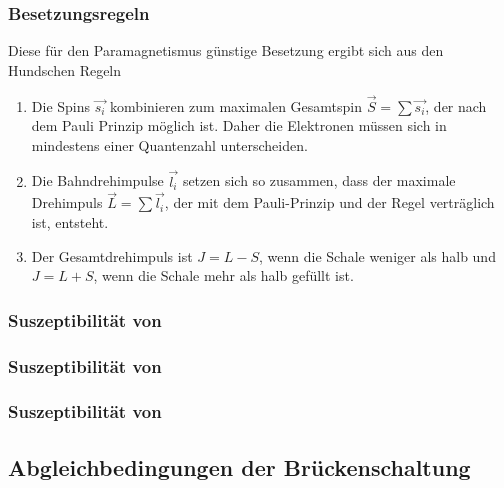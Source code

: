 \subsubsection{Besetzungsregeln}
Diese für den Paramagnetismus günstige Besetzung ergibt sich aus den Hundschen Regeln
\begin{enumerate}
    \item{ Die Spins $\vec{s_i}$ kombinieren zum maximalen Gesamtspin $\vec{S}=\sum\vec{s_i}$, der nach dem Pauli
    Prinzip möglich ist. Daher die Elektronen müssen sich in mindestens einer Quantenzahl unterscheiden.}
    \item Die Bahndrehimpulse $\vec{l_i}$ setzen sich so zusammen, dass der maximale Drehimpuls 
    $\vec{L}=\sum\vec{l_i}$, der mit dem Pauli-Prinzip und der Regel verträglich ist, entsteht.
    \item Der Gesamtdrehimpuls ist $J=L-S$, wenn die Schale weniger als halb und 
    $J=L+S$, wenn die Schale mehr als halb gefüllt ist.
    \label{Hundsche_Regel}
\end{enumerate}

\subsubsection{Suszeptibilität von }
\subsubsection{Suszeptibilität von }
\subsubsection{Suszeptibilität von }
\subsection{Abgleichbedingungen der Brückenschaltung}
\cite{sample}
